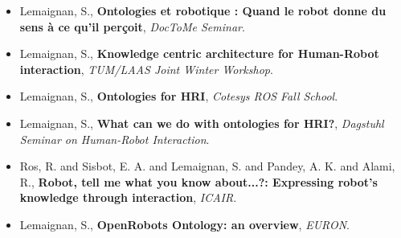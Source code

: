 \begin{itemize}
    \item{Lemaignan, S., \textbf{Ontologies et robotique : Quand le robot donne du sens à ce qu'il perçoit}, \textit{DocToMe Seminar}.}
    \item{Lemaignan, S., \textbf{Knowledge centric architecture for Human-Robot interaction}, \textit{TUM/LAAS Joint Winter Workshop}.}
    \item{Lemaignan, S., \textbf{Ontologies for HRI}, \textit{Cotesys ROS Fall School}.}
    \item{Lemaignan, S., \textbf{What can we do with ontologies for HRI?}, \textit{Dagstuhl Seminar on Human-Robot Interaction}.}
    \item{Ros, R. and Sisbot, E. A. and Lemaignan, S. and Pandey, A. K. and Alami, R., \textbf{Robot, tell me what you know about...?: Expressing robot's knowledge through interaction}, \textit{ICAIR}.}
    \item{Lemaignan, S., \textbf{OpenRobots Ontology: an overview}, \textit{EURON}.}
\end{itemize}
